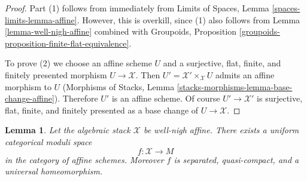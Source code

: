\documentclass[10pt,a4paper]{amsart}
\theoremstyle{plain}
\newtheorem{lemma}[subsection]{Lemma}
\theoremstyle{definition}
\theoremstyle{remark}
\numberwithin{equation}{subsection}
\begin{document}
\begin{proof}
Part (1) follows from immediately from
Limits of Spaces, Lemma \ref{spaces-limits-lemma-affine}.
However, this is overkill, since (1) also follows from
Lemma \ref{lemma-well-nigh-affine} combined with
Groupoids, Proposition
\ref{groupoids-proposition-finite-flat-equivalence}.

\medskip\noindent
To prove (2) we choose an affine scheme $U$ and a
surjective, flat, finite, and finitely presented morphism $U \to \mathcal{X}$.
Then $U' = \mathcal{X}' \times_\mathcal{X} U$ admits an affine
morphism to $U$ (Morphisms of Stacks, Lemma
\ref{stacks-morphisms-lemma-base-change-affine}).
Therefore $U'$ is an affine scheme. Of course
$U' \to \mathcal{X}'$ is surjective, flat, finite, and finitely presented
as a base change of $U \to \mathcal{X}$.
\end{proof}

\begin{lemma}
\label{lemma-well-nigh-affine-moduli-space}
Let the algebraic stack $\mathcal{X}$ be well-nigh affine. There exists
a uniform categorical moduli space
$$
f : \mathcal{X} \longrightarrow M
$$
in the category of affine schemes. Moreover
$f$ is separated, quasi-compact, and a universal homeomorphism.
\end{lemma}
\end{document}

